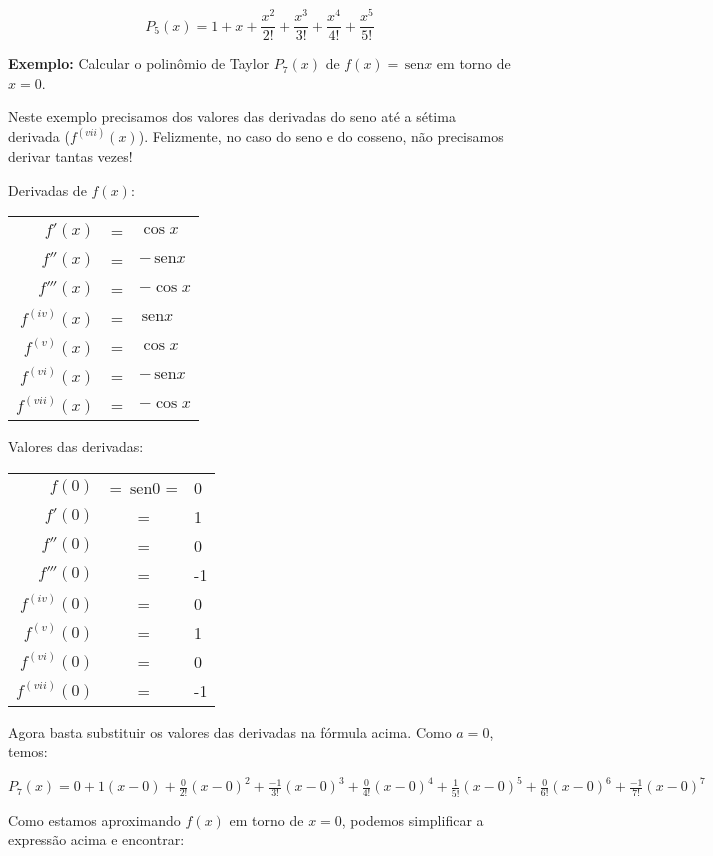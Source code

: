 \documentclass[a4paper]{article}
\providecommand{\sin}{} \renewcommand{\sin}{\hspace{2pt}\mathrm{sen}}
\begin{document}
\begin{displaymath}
  P_5(x) = 1+ x + \frac{x^2}{2!} + \frac{x^3}{3!} + \frac{x^4}{4!} + \frac{x^5}{5!}
\end{displaymath}

{\bf Exemplo:} Calcular o polinômio de Taylor $P_7(x)$ de $f(x)=\sin x$ em torno de $x=0$.

Neste exemplo precisamos dos valores das derivadas do seno até a sétima derivada ($f^{(vii)}(x)$).
Felizmente, no caso do seno e do cosseno, não precisamos derivar tantas vezes!

\begin{multicols}{2}

Derivadas de $f(x)$:

  \begin{tabular}{rcl}
    $f'(x)$ &=& $\cos x$\\
    $f''(x)$ &=& $-\sin x$\\
    $f'''(x)$ &=& $-\cos x$\\
    $f^{(iv)}(x)$ &=& $\sin x$\\
    $f^{(v)}(x)$ &=& $\cos x$\\
    $f^{(vi)}(x)$ &=& $-\sin x$\\
    $f^{(vii)}(x)$ &=& $-\cos x$\\
  \end{tabular}

  \columnbreak

Valores das derivadas:

  \begin{tabular}{rcl}
    $f(0)$ &= $\sin 0$ =& 0\\
    $f'(0)$ &=& 1\\
    $f''(0)$ &=& 0\\
    $f'''(0)$ &=& -1\\
    $f^{(iv)}(0)$ &=& 0\\
    $f^{(v)}(0)$ &=& 1\\
    $f^{(vi)}(0)$ &=& 0\\
    $f^{(vii)}(0)$ &=& -1\\
  \end{tabular}
\end{multicols}

Agora basta substituir os valores das derivadas na fórmula acima.
Como $a=0$, temos:

$P_7(x) = 0+ 1(x-0) + \frac{0}{2!}(x-0)^2 + \frac{-1}{3!}(x-0)^3 + \frac{0}{4!}(x-0)^4 + \frac{1}{5!}(x-0)^5 + \frac{0}{6!}(x-0)^6 + \frac{-1}{7!}(x-0)^7$

Como estamos aproximando $f(x)$ em torno de $x=0$, podemos simplificar a expressão acima e encontrar:
\end{document}
